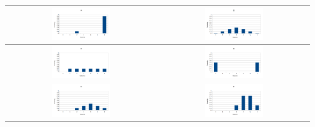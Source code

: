 \documentclass[11pt, preview]{standalone} %
\begin{document}
\begin{enumerate}
\begin{center}
\begin{tabular}{c|c}
\includegraphics[width=0.4\textwidth]{dists/candy.png} &
\includegraphics[width=0.4\textwidth]{dists/binom.png}
\\
\hline 
\includegraphics[width=0.4\textwidth]{dists/uniform.png}&
\includegraphics[width=0.4\textwidth]{dists/extreme.png}\\
\hline \vspace{2mm}
\includegraphics[width=0.4\textwidth]{dists/twodice.png}&
\includegraphics[width=0.4\textwidth]{dists/threeflips.png}\\
\end{tabular}
\end{center}


\end{enumerate}
\end{document}
